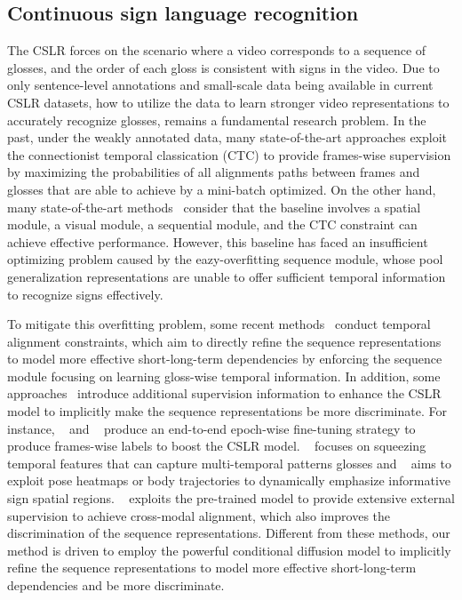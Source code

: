 \documentclass[sigconf]{acmart}
\begin{document}
\subsection{Continuous sign language recognition}
\label{sec_realred_cslr}
The CSLR forces on the scenario where a video corresponds to a sequence of glosses, and the order of each gloss is consistent with signs in the video. 
Due to only sentence-level annotations and small-scale data being available in current CSLR datasets, how to utilize the data to learn stronger video representations to accurately recognize glosses, remains a fundamental research problem.
In the past, under the weakly annotated data, many state-of-the-art approaches exploit
the connectionist temporal classication (CTC)\cite{graves2006connectionist} to provide frames-wise supervision by maximizing the probabilities of all alignments paths between frames and glosses that are able to achieve by a mini-batch optimized. 
On the other hand, many state-of-the-art  methods~\cite{cui2019deep,min2021visual,hao2021self,hu2022temporal,Hu2022SelfEmphasizingNF,CVTSLR2023,hu2023continuous} consider that the baseline involves a spatial module, a visual module, a sequential module, and the CTC constraint can achieve effective performance.
However, this baseline has faced an insufficient optimizing problem caused by the eazy-overfitting sequence module, whose pool generalization representations are unable to offer sufficient temporal information to recognize signs effectively. 


To mitigate this overfitting problem, some recent methods~\cite{min2021visual,hao2021self,zuo2022c2slr} conduct temporal alignment constraints, which aim to directly refine the sequence representations to model more effective short-long-term dependencies by enforcing the sequence module focusing on learning gloss-wise temporal information.
In addition, some approaches~\cite{cheng2020fully,hao2021self,hu2022temporal,Hu2022SelfEmphasizingNF,hu2023continuous,chen2022simple,CVTSLR2023} introduce additional supervision information to enhance the CSLR model to implicitly make the sequence representations be more discriminate.
For instance, ~\cite{cheng2020fully} and ~\cite{hao2021self} produce an end-to-end epoch-wise fine-tuning strategy to produce frames-wise labels to boost the CSLR model.
~\cite{hu2022temporal} focuses on squeezing
temporal features that can capture multi-temporal patterns glosses and ~\cite{zuo2022c2slr, Hu2022SelfEmphasizingNF,hu2023continuous} aims to exploit pose heatmaps or body trajectories to dynamically
emphasize informative sign spatial regions.
~\cite{chen2022simple,CVTSLR2023} exploits the pre-trained model to provide extensive external supervision to achieve cross-modal alignment, which also improves the discrimination of the sequence representations.
Different from these methods, our method is driven to employ the powerful conditional diffusion model to implicitly refine the sequence representations to model more effective short-long-term dependencies and be more discriminate.
\end{document}
